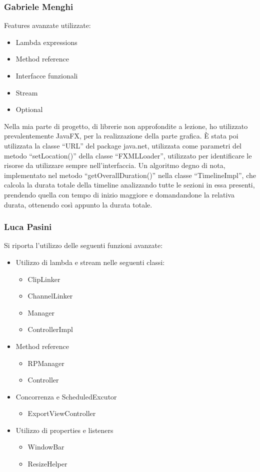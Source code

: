 \documentclass[a4paper,12pt]{report}
\begin{document}
\subsubsection{Gabriele Menghi}
Features avanzate utilizzate:
\begin{itemize}
    \item Lambda expressions 
    \item Method reference
    \item Interfacce funzionali
    \item Stream
    \item Optional
\end{itemize}
Nella mia parte di progetto, di librerie non approfondite a lezione, ho utilizzato prevalentemente JavaFX, per la realizzazione della parte grafica. È stata poi utilizzata la classe “URL” del package java.net, utilizzata come parametri del metodo “setLocation()” della classe “FXMLLoader”, utilizzato per identificare le risorse da utilizzare sempre nell’interfaccia.
Un algoritmo degno di nota, implementato nel metodo “getOverallDuration()” nella classe “TimelineImpl”, che calcola la durata totale della timeline analizzando tutte le sezioni in essa presenti, prendendo quella con tempo di inizio maggiore e domandandone la relativa durata, ottenendo così appunto la durata totale.
\endsubsubsection

\subsubsection{Luca Pasini}
Si riporta l’utilizzo delle seguenti funzioni avanzate:
\begin{itemize}
    \item Utilizzo di lambda e stream nelle seguenti classi:
    \begin{itemize}
        \item ClipLinker
        \item ChannelLinker
        \item Manager
        \item ControllerImpl
    \end{itemize}
    \item Method reference
    \begin{itemize}
        \item RPManager
        \item Controller
    \end{itemize}
    \item Concorrenza e ScheduledExcutor
    \begin{itemize}
        \item ExportViewController
    \end{itemize}
    \item Utilizzo di properties e listeners
    \begin{itemize}
        \item WindowBar
        \item ResizeHelper
    \end{itemize}
\end{itemize}
\end{document}
